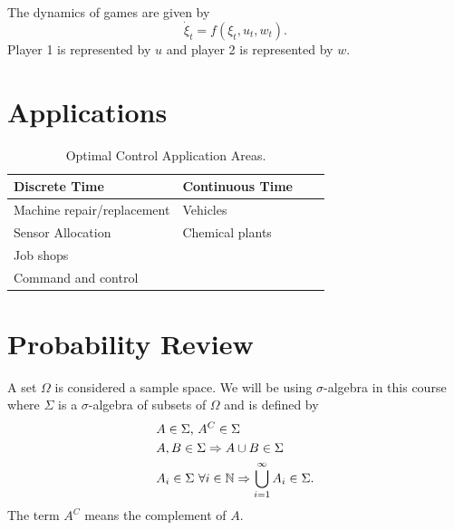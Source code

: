 The dynamics of games are given by
$$\dot\xi_t = f(\xi_t,u_t,w_t).$$
Player 1 is represented by $u$ and player 2 is represented by $w$.

\section{Applications}
\begin{table}[ht!]
\caption{Optimal Control Application Areas.}
\small
\centering
\begin{tabular}{@{}lllr@{}} \toprule
Discrete Time              & Continuous Time \\ \midrule
Machine repair/replacement & Vehicles        \\
Sensor Allocation          & Chemical plants \\
Job shops                  &                 \\
Command and control        &                 \\ \bottomrule
\end{tabular}
\label{tab:applications}
\end{table}

\section{Probability Review}
A set $\Omega$ is considered a sample space.
We will be using $\sigma$-algebra in this course where $\Sigma$ is a $\sigma$-algebra of subsets of $\Omega$  and is defined by
\begin{align*}
&A \in \Sigma \textnormal{, } A^C \in \Sigma \\
&A,B \in \Sigma \Rightarrow A \cup B \in \Sigma \\
&A_i \in \Sigma~\forall i \in \mathbb{N} \Rightarrow \bigcup_{i=1}^\infty A_i \in \Sigma.
\end{align*}
The term $A^C$ means the complement of $A$.

